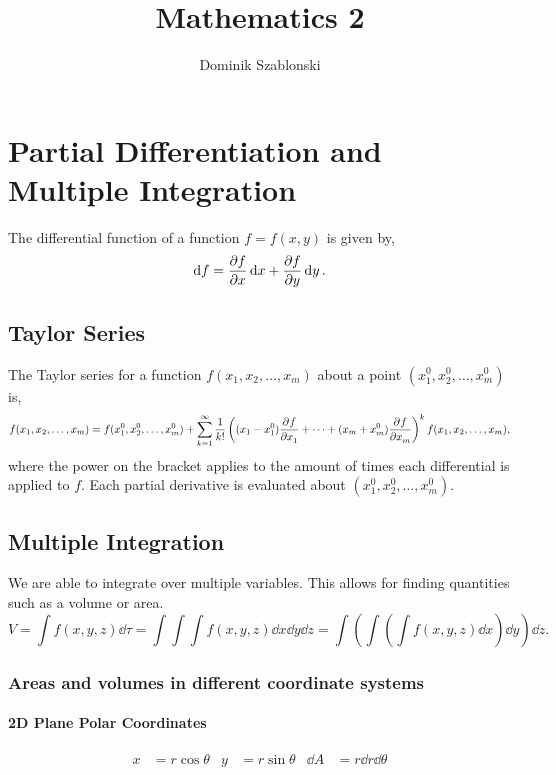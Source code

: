 \documentclass{book}
\title{Mathematics 2}
\author{Dominik Szablonski}
\begin{document}
\maketitle

\tableofcontents

\chapter{Partial Differentiation and Multiple Integration}
The differential function of a function $f = f(x,y)$ is given by,
\begin{equation}
    \dd{f} = \pdv{f}{x}\dd{x} + \pdv{f}{y}\dd{y}.
\end{equation}
\section{Taylor Series}
The Taylor series for a function $f(x_1,x_2,\ldots,x_m)$ about a point $(x_1^0,x_2^0,\ldots,x_m^0)$ is,
\begin{equation}
    f(x_1,x_2,\ldots,x_m) = f(x_1^0,x_2^0,\ldots,x_m^0) + \sum_{k=1}^{\infty}\frac{1}{k!}\left((x_1-x_1^0)\pdv[]{f}{x_1}+\cdots+(x_m + x_m^0)\pdv[]{f}{x_m}\right)^kf(x_1,x_2,\ldots,x_m),
\end{equation}
where the power on the bracket applies to the amount of times each differential is applied to $f$. Each partial derivative is evaluated about $(x_1^0,x_2^0,\ldots,x_m^0)$.
\section{Multiple Integration}
We are able to integrate over multiple variables. This allows for finding quantities such as a volume or area. 
\begin{equation}
    V = \int f(x,y,z)\dd{\tau} = \int \int \int f(x,y,z) \dd{x}\dd{y}\dd{z} = \int \left( \int \left( \int f(x,y,z) \dd{x}\right)\dd{y}\right)\dd{z}.
\end{equation}
\subsection{Areas and volumes in different coordinate systems}
\subsubsection{2D Plane Polar Coordinates}
\begin{align}
    x&=r\cos\theta & y&=r\sin\theta &\dd{A}&=r\dd{r}\dd{\theta}
\end{align}
\end{document}
